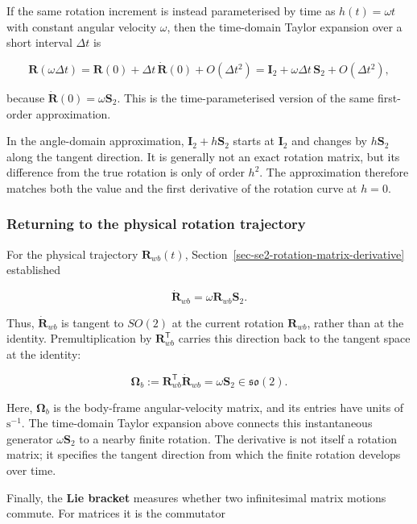 \documentclass[
  australian,
  12pt,
  letterpaper,
  DIV=11,
  numbers=noendperiod,
  twoside]{scrreprt}
\begin{document}
If the same rotation increment is instead parameterised by time as
\(h(t)=\omega t\) with constant angular velocity \(\omega\), then the
time-domain Taylor expansion over a short interval \(\Delta t\) is

\[
\mathbf R(\omega\Delta t)
=
\mathbf R(0)
+\Delta t\,\dot{\mathbf R}(0)
+O(\Delta t^2)
=
\mathbf I_2
+\omega\Delta t\,\mathbf S_2
+O(\Delta t^2),
\]

because \(\dot{\mathbf R}(0)=\omega\mathbf S_2\). This is the
time-parameterised version of the same first-order approximation.

In the angle-domain approximation, \(\mathbf I_2+h\mathbf S_2\) starts
at \(\mathbf I_2\) and changes by \(h\mathbf S_2\) along the tangent
direction. It is generally not an exact rotation matrix, but its
difference from the true rotation is only of order \(h^2\). The
approximation therefore matches both the value and the first derivative
of the rotation curve at \(h=0\).

\subsubsection{Returning to the physical rotation
trajectory}\label{returning-to-the-physical-rotation-trajectory}

For the physical trajectory \(\mathbf R_{wb}(t)\),
Section~\ref{sec-se2-rotation-matrix-derivative} established

\[
\dot{\mathbf R}_{wb}
=
\omega\mathbf R_{wb}\mathbf S_2.
\]

Thus, \(\dot{\mathbf R}_{wb}\) is tangent to \(SO(2)\) at the current
rotation \(\mathbf R_{wb}\), rather than at the identity.
Premultiplication by \(\mathbf R_{wb}^\mathsf T\) carries this direction
back to the tangent space at the identity:

\[
\boxed{
\boldsymbol\Omega_b
\mathrel{:=}
\mathbf R_{wb}^\mathsf T\dot{\mathbf R}_{wb}
=
\omega\mathbf S_2
\in
\mathfrak{so}(2)
}.
\]

Here, \(\boldsymbol\Omega_b\) is the body-frame angular-velocity matrix,
and its entries have units of \(\mathrm{s^{-1}}\). The time-domain
Taylor expansion above connects this instantaneous generator
\(\omega\mathbf S_2\) to a nearby finite rotation. The derivative is not
itself a rotation matrix; it specifies the tangent direction from which
the finite rotation develops over time.

Finally, the \textbf{Lie bracket} measures whether two infinitesimal
matrix motions commute. For matrices it is the commutator
\end{document}
